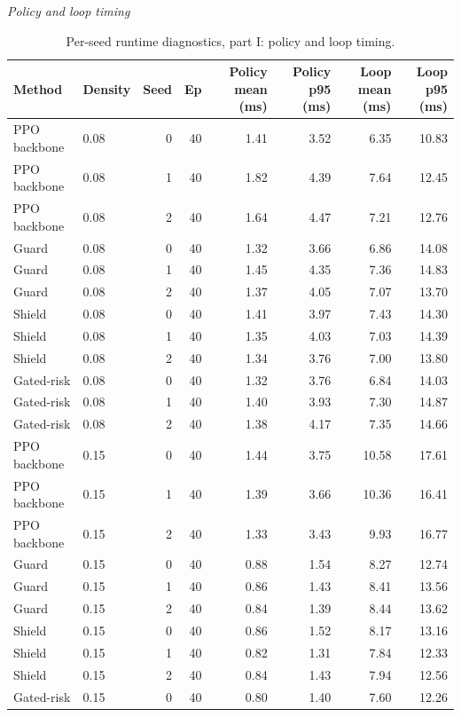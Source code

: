 \begin{table}[!htbp]
\centering
\caption{Per-seed runtime diagnostics, part I: policy and loop timing.}
\label{tab_runtime_by_seed}
\tiny
\setlength{\tabcolsep}{3.2pt}
\renewcommand{\arraystretch}{1.04}
\textit{Policy and loop timing}\par
\begin{tabular}{@{}llrrrrrr@{}}
\toprule
Method & Density & Seed & Ep & Policy mean (ms) & Policy p95 (ms) & Loop mean (ms) & Loop p95 (ms) \\
\midrule
PPO backbone & 0.08 & 0 & 40 & 1.41 & 3.52 & 6.35 & 10.83 \\
PPO backbone & 0.08 & 1 & 40 & 1.82 & 4.39 & 7.64 & 12.45 \\
PPO backbone & 0.08 & 2 & 40 & 1.64 & 4.47 & 7.21 & 12.76 \\
Guard & 0.08 & 0 & 40 & 1.32 & 3.66 & 6.86 & 14.08 \\
Guard & 0.08 & 1 & 40 & 1.45 & 4.35 & 7.36 & 14.83 \\
Guard & 0.08 & 2 & 40 & 1.37 & 4.05 & 7.07 & 13.70 \\
Shield & 0.08 & 0 & 40 & 1.41 & 3.97 & 7.43 & 14.30 \\
Shield & 0.08 & 1 & 40 & 1.35 & 4.03 & 7.03 & 14.39 \\
Shield & 0.08 & 2 & 40 & 1.34 & 3.76 & 7.00 & 13.80 \\
Gated-risk & 0.08 & 0 & 40 & 1.32 & 3.76 & 6.84 & 14.03 \\
Gated-risk & 0.08 & 1 & 40 & 1.40 & 3.93 & 7.30 & 14.87 \\
Gated-risk & 0.08 & 2 & 40 & 1.38 & 4.17 & 7.35 & 14.66 \\
PPO backbone & 0.15 & 0 & 40 & 1.44 & 3.75 & 10.58 & 17.61 \\
PPO backbone & 0.15 & 1 & 40 & 1.39 & 3.66 & 10.36 & 16.41 \\
PPO backbone & 0.15 & 2 & 40 & 1.33 & 3.43 & 9.93 & 16.77 \\
Guard & 0.15 & 0 & 40 & 0.88 & 1.54 & 8.27 & 12.74 \\
Guard & 0.15 & 1 & 40 & 0.86 & 1.43 & 8.41 & 13.56 \\
Guard & 0.15 & 2 & 40 & 0.84 & 1.39 & 8.44 & 13.62 \\
Shield & 0.15 & 0 & 40 & 0.86 & 1.52 & 8.17 & 13.16 \\
Shield & 0.15 & 1 & 40 & 0.82 & 1.31 & 7.84 & 12.33 \\
Shield & 0.15 & 2 & 40 & 0.84 & 1.43 & 7.94 & 12.56 \\
Gated-risk & 0.15 & 0 & 40 & 0.80 & 1.40 & 7.60 & 12.26 \\

\end{tabular}
\end{table}
